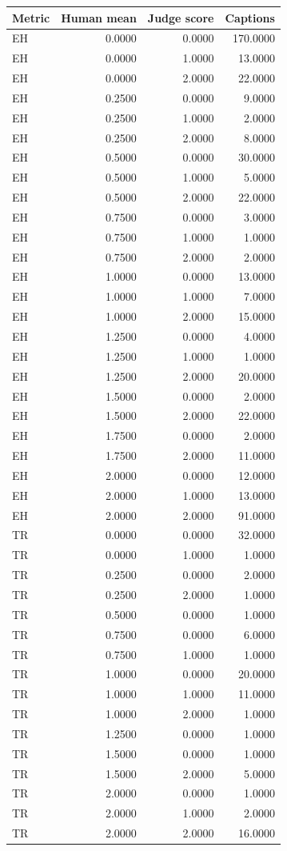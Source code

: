 \begin{tabular}{lrrr}
\toprule
Metric & Human mean & Judge score & Captions \\
\midrule
EH & 0.0000 & 0.0000 & 170.0000 \\
EH & 0.0000 & 1.0000 & 13.0000 \\
EH & 0.0000 & 2.0000 & 22.0000 \\
EH & 0.2500 & 0.0000 & 9.0000 \\
EH & 0.2500 & 1.0000 & 2.0000 \\
EH & 0.2500 & 2.0000 & 8.0000 \\
EH & 0.5000 & 0.0000 & 30.0000 \\
EH & 0.5000 & 1.0000 & 5.0000 \\
EH & 0.5000 & 2.0000 & 22.0000 \\
EH & 0.7500 & 0.0000 & 3.0000 \\
EH & 0.7500 & 1.0000 & 1.0000 \\
EH & 0.7500 & 2.0000 & 2.0000 \\
EH & 1.0000 & 0.0000 & 13.0000 \\
EH & 1.0000 & 1.0000 & 7.0000 \\
EH & 1.0000 & 2.0000 & 15.0000 \\
EH & 1.2500 & 0.0000 & 4.0000 \\
EH & 1.2500 & 1.0000 & 1.0000 \\
EH & 1.2500 & 2.0000 & 20.0000 \\
EH & 1.5000 & 0.0000 & 2.0000 \\
EH & 1.5000 & 2.0000 & 22.0000 \\
EH & 1.7500 & 0.0000 & 2.0000 \\
EH & 1.7500 & 2.0000 & 11.0000 \\
EH & 2.0000 & 0.0000 & 12.0000 \\
EH & 2.0000 & 1.0000 & 13.0000 \\
EH & 2.0000 & 2.0000 & 91.0000 \\
TR & 0.0000 & 0.0000 & 32.0000 \\
TR & 0.0000 & 1.0000 & 1.0000 \\
TR & 0.2500 & 0.0000 & 2.0000 \\
TR & 0.2500 & 2.0000 & 1.0000 \\
TR & 0.5000 & 0.0000 & 1.0000 \\
TR & 0.7500 & 0.0000 & 6.0000 \\
TR & 0.7500 & 1.0000 & 1.0000 \\
TR & 1.0000 & 0.0000 & 20.0000 \\
TR & 1.0000 & 1.0000 & 11.0000 \\
TR & 1.0000 & 2.0000 & 1.0000 \\
TR & 1.2500 & 0.0000 & 1.0000 \\
TR & 1.5000 & 0.0000 & 1.0000 \\
TR & 1.5000 & 2.0000 & 5.0000 \\
TR & 2.0000 & 0.0000 & 1.0000 \\
TR & 2.0000 & 1.0000 & 2.0000 \\
TR & 2.0000 & 2.0000 & 16.0000 \\
\bottomrule
\end{tabular}
